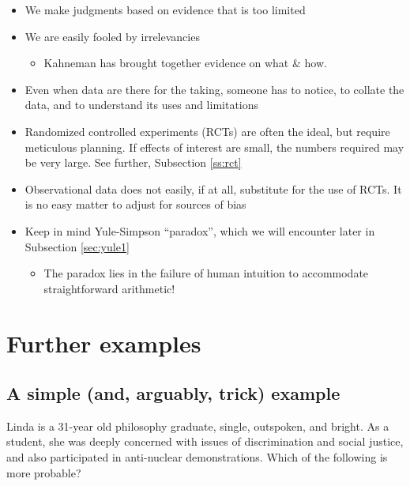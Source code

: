 \documentclass[
  10pt,
  b5paper]{book}
\providecommand{\tightlist}{%
  \setlength{\itemsep}{0pt}\setlength{\parskip}{0pt}}
\begin{document}
\begin{itemize}
\tightlist
\item
  We make judgments based on evidence that is too limited
\item
  We are easily fooled by irrelevancies

  \begin{itemize}
  \tightlist
  \item
    Kahneman has brought together evidence on what \& how.
  \end{itemize}
\item
  Even when data are there for the taking, someone has to notice, to collate the data, and to understand its uses and limitations
\item
  Randomized controlled experiments (RCTs) are often the ideal, but require meticulous planning. If effects of interest are small, the numbers required may be very large. See further, Subsection \ref{ss:rct}
\item
  Observational data does not easily, if at all, substitute for the use of RCTs. It is no easy matter to adjust for sources of bias
\item
  Keep in mind Yule-Simpson ``paradox'', which we will encounter later in Subsection \ref{sec:yule1}

  \begin{itemize}
  \tightlist
  \item
    The paradox lies in the failure of human intuition to accommodate straightforward arithmetic!
  \end{itemize}
\end{itemize}

\hypertarget{further-examples}{%
\section{Further examples}\label{further-examples}}

\hypertarget{a-simple-and-arguably-trick-example}{%
\subsection*{A simple (and, arguably, trick) example}\label{a-simple-and-arguably-trick-example}}

Linda is a 31-year old philosophy graduate, single, outspoken, and bright. As a student, she was deeply concerned with issues of discrimination and social justice, and also participated in anti-nuclear demonstrations. Which of the following is more probable?
\end{document}
